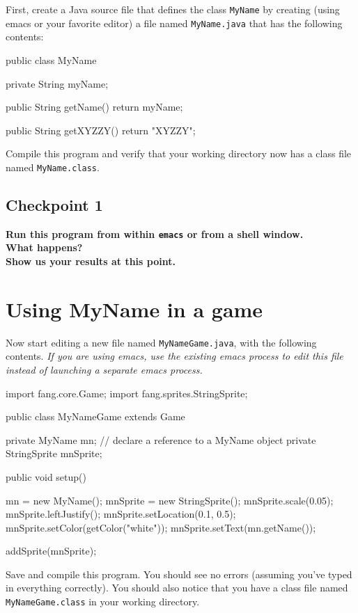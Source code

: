 \documentclass[12pt]{article}
\newenvironment{qv}%
  {\quote
   \verbatim}%
  {\endverbatim
   \endquote}
\newcommand{\code}{\texttt}
\newcommand{\fname}{\texttt}
\begin{document}
First, create a Java source file that defines the class \code{MyName}
by creating (using emacs or your favorite editor)
a file named \code{MyName.java} that has the following
contents:

\begin{qv}
public class MyName {

  private String myName;

  public String getName() {
    return myName;
  }

  public String getXYZZY() {
    return "XYZZY";
  }
}
\end{qv}

Compile this program and verify that your working directory now has a
class file named \code{MyName.class}.

\subsection*{Checkpoint 1}
{\bf
Run this program from within \fname{emacs} or from a shell window.\\
What happens?\\
Show us your results at this point.
}

\section*{Using MyName in a game}
Now start editing a new file named \code{MyNameGame.java}, with the
following contents.
{\em If you are using emacs, use the existing emacs process
to edit this file instead of launching a separate emacs process.}

\begin{qv}
import fang.core.Game;
import fang.sprites.StringSprite;

public class MyNameGame extends Game {

  private MyName mn; // declare a reference to a MyName object
  private StringSprite mnSprite;

  public void setup() {
    mn = new MyName();
    mnSprite = new StringSprite();
    mnSprite.scale(0.05);
    mnSprite.leftJustify();
    mnSprite.setLocation(0.1, 0.5);
    mnSprite.setColor(getColor("white"));
    mnSprite.setText(mn.getName());
    
    addSprite(mnSprite);
  }
}
\end{qv}

Save and compile this program.  You should see no errors (assuming
you've typed in everything correctly).  You should also notice that
you have a class file named \code{MyNameGame.class} in your working
directory.
    
\end{document}
